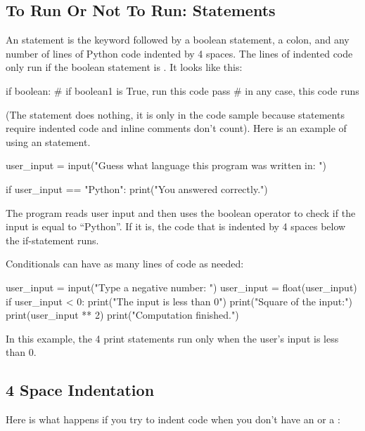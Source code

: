 \documentclass[11pt]{cselabheader}
\begin{document}
\subsection{To Run Or Not To Run:  Statements}

An  statement is the keyword 
followed by a boolean statement, a colon, and any number of lines of
Python code indented by 4 spaces.
The lines of indented code only run if the boolean statement is .
It looks like this:

\begin{python3code}
if boolean:
    # if boolean1 is True, run this code
    pass
# in any case, this code runs
\end{python3code}

(The  statement does nothing, it is only in the
code sample because 
statements require indented code and inline comments don't count).
Here is an example of using an  statement.

\begin{python3code}
user_input = input("Guess what language this program was written in: ")

if user_input == "Python":
    print("You answered correctly.")
\end{python3code}

The program reads user input and then uses the boolean operator
\pythoninline{==} to check if the input is equal to
``Python''. If it is, the code that is indented by 4 spaces below the if-statement runs.

Conditionals can have as many lines of code as needed:

\begin{python3code}
user_input = input("Type a negative number: ")
user_input = float(user_input)
if user_input < 0:
    print("The input is less than 0")
    print("Square of the input:")
    print(user_input ** 2)
    print("Computation finished.")
\end{python3code}

In this example, the 4 print statements run only when the user's input
is less than 0.

\subsection{4 Space Indentation}

Here is what happens if you try to indent code when you don't have an
 or a :
\end{document}
